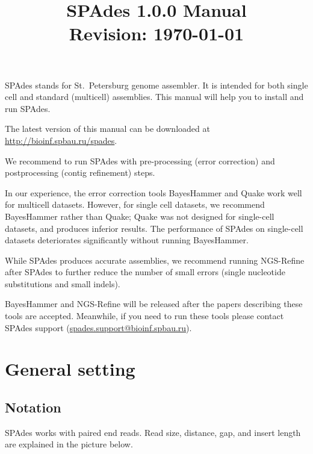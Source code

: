 \documentclass{article}
\def\spades{SPAdes}
\begin{document}
\title{{\spades} 1.0.0 Manual\\{\small Revision: \today}}
\date{}
\maketitle

{\spades} stands for St.~Petersburg genome assembler.
It is intended for both single cell and standard (multicell) 
assemblies. This manual will help you to install and run
{\spades}.

The latest version of this manual can be downloaded at \url{http://bioinf.spbau.ru/spades}.

We recommend to run {\spades} with pre-processing (error correction) and postprocessing (contig refinement) steps.

In our experience, the error correction tools BayesHammer and Quake work well for multicell datasets. 
However, for single cell datasets, we recommend BayesHammer rather than Quake; 
Quake was not designed for single-cell datasets, and produces inferior results. 
The performance of {\spades} on single-cell datasets deteriorates 
significantly without running BayesHammer. 

While {\spades} produces accurate assemblies, 
we recommend running NGS-Refine after {\spades} to further reduce the number of 
small errors (single nucleotide substitutions and small indels).

BayesHammer and NGS-Refine will be released after the papers describing these tools are accepted. 
Meanwhile, if you need to run these tools please contact SPAdes support (\url{spades.support@bioinf.spbau.ru}).


\renewcommand{\contentsname}{}
\tableofcontents



\pagebreak

\section{General setting}
\subsection{Notation}
{\spades} works with paired end reads.
Read size, distance, gap, and insert length are 
explained in the picture below.

\begin{center}
\end{center}
\end{document}
